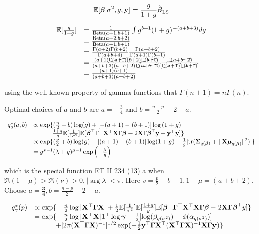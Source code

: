\documentclass{amsart}[12pt]
\begin{document}
\[
	\mathbb{E}[{\boldsymbol \beta} | \sigma^2, g, {\bf y}] = \frac{g}{1 + g} \hat{{\boldsymbol \beta}}_{\text{LS}}
\]

\begin{equation*}
\begin{array}{rl}
\mathbb{E}[\frac{g}{1 + g}] &= \frac{1}{\text{Beta}(a +1, b + 1)} \int g^{b+1} (1 + g)^{-(a + b + 3)} dg \\
&= \frac{\text{Beta}(a + 2, b + 2)}{\text{Beta}(a + 1, b + 1)} \\
&= \frac{\Gamma(a + 2) \Gamma(b + 2)}{\Gamma(a + b + 4)} \frac{\Gamma(a + b + 2)}{\Gamma(a + 1) \Gamma(b + 1)} \\
&=  \frac{(a + 1) \cancel{\Gamma(a + 1)} (b + 2) \cancel{\Gamma(b + 1)}}{(a + b + 3) (a + b + 2) \cancel{\Gamma(a + b + 2)}} \frac{\cancel{\Gamma(a + b + 2)}}{\cancel{\Gamma(a + 1)} \cancel{\Gamma(b + 1)}} \\
&= \frac{(a + 1) (b + 1)}{(a + b + 3) (a + b + 2)}
\end{array}
\end{equation*}

using the well-known property of gamma functions that $\Gamma(n + 1) = n \Gamma(n)$.

Optimal choices of $a$ and $b$ are $a = -\frac{3}{4}$ and $b=\frac{n-p}{2} - 2 - a$.

\begin{equation*}
\begin{array}{rl}
q^*_g(a, b) &\propto \exp \{(\frac{n}{2} + b) \log (g) + [-(a + 1) - (b + 1)] \log{(1 + g)} \\
&\qquad \quad \frac{1 + g}{g} \mathbb{E} [\frac{1}{1 \sigma^2}] \mathbb{E}[{\boldsymbol \beta}^\top \Gamma^\top {\bf X}^\top {\bf X} \Gamma {\boldsymbol\beta} - 2 {\bf X} \Gamma {\boldsymbol\beta}^\top {\bf y} + {\bf y}^\top {\bf y}] \} \\
&\propto \exp \{ (\frac{p}{2} + b) \log (g) - [(a + 1) + (b + 1)] \log (1 + g) - \frac{1}{g}[\text{tr}({\boldsymbol \Sigma}_{q({\boldsymbol \beta})} + \| {\bf X} {\boldsymbol \mu}_{q({\boldsymbol \beta})} \|^2)] \} \\
&= g^{v-1} (\lambda + g)^{\mu - 1} \exp{\left (-\frac{\beta}{g}\right )}
\end{array}
\end{equation*}

which is the special function ET II 234 (13) a when $\Re(1 - \mu) > \Re(\nu) > 0, | \arg \lambda | < \pi$. Here
$v = \frac{p}{2} + b + 1, 1 - \mu = (a + b + 2)$. Choose $a = \frac{3}{4}, b = \frac{n - p}{2} - 2 - a$.

\begin{equation*}
\begin{array}{rl}
q^*_\gamma (p) &\propto \exp \{ \quad \frac{n}{2} \log |{\bf X}^\top {\boldsymbol\Gamma} {\bf X}|
															+ \tfrac{1}{2} \mathbb{E}[\frac{1}{\sigma^2}] \mathbb{E}[\frac{1 + g}{g}] 
																\mathbb{E}[{\boldsymbol \beta}^\top {\boldsymbol\Gamma}^\top {\bf X}^\top {\bf X} {\boldsymbol\Gamma} {\boldsymbol\beta} - 2 {\bf X} {\boldsymbol \Gamma} {\boldsymbol \beta}^\top y]\} \\
&= \exp \{\quad \frac{n}{2} \log{|{\bf X}^\top {\bf X}|} {\bf1}^\top \log {\boldsymbol\gamma} - \tfrac{1}{2} [\log (\beta_{q(\sigma^2)}) - \phi(\alpha_{q(\sigma^2)})] \\
&\qquad \quad + |2 \pi ({\bf X}^\top \Gamma {\bf X})^{-1}|^{1/2} \exp(-\tfrac{1}{2} {\bf y}^\top {\boldsymbol\Gamma} {\bf X}^\top ({\bf X}^\top {\boldsymbol\Gamma} {\bf X})^{-1} {\bf X} {\boldsymbol \Gamma} {\bf y}) \}
\end{array}
\end{equation*}
\end{document}
